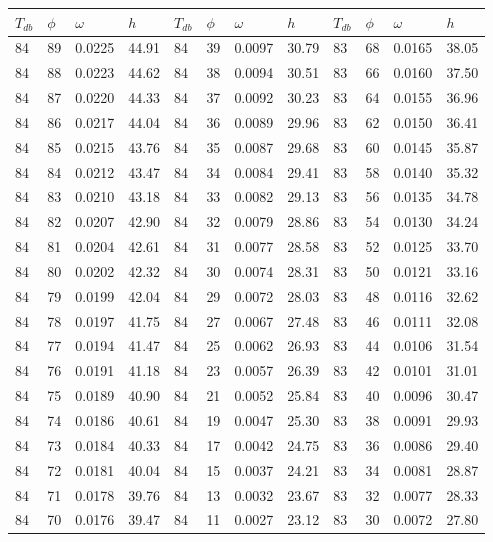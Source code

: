 \begin{tabular}{llll|llll|llll}
 \toprule 
\(T_{db}\) & \(\phi\) & \(\omega\) & \(h\) & \(T_{db}\) & \(\phi\) & \(\omega\) & \(h\) & \(T_{db}\) & \(\phi\) & \(\omega\) & \(h\)  \\ \midrule 
84 & 89 & 0.0225 & 44.91 & 84 & 39 & 0.0097 & 30.79 & 83 & 68 & 0.0165 & 38.05\\
84 & 88 & 0.0223 & 44.62 & 84 & 38 & 0.0094 & 30.51 & 83 & 66 & 0.0160 & 37.50\\
84 & 87 & 0.0220 & 44.33 & 84 & 37 & 0.0092 & 30.23 & 83 & 64 & 0.0155 & 36.96\\
84 & 86 & 0.0217 & 44.04 & 84 & 36 & 0.0089 & 29.96 & 83 & 62 & 0.0150 & 36.41\\
84 & 85 & 0.0215 & 43.76 & 84 & 35 & 0.0087 & 29.68 & 83 & 60 & 0.0145 & 35.87\\
84 & 84 & 0.0212 & 43.47 & 84 & 34 & 0.0084 & 29.41 & 83 & 58 & 0.0140 & 35.32\\
84 & 83 & 0.0210 & 43.18 & 84 & 33 & 0.0082 & 29.13 & 83 & 56 & 0.0135 & 34.78\\
84 & 82 & 0.0207 & 42.90 & 84 & 32 & 0.0079 & 28.86 & 83 & 54 & 0.0130 & 34.24\\
84 & 81 & 0.0204 & 42.61 & 84 & 31 & 0.0077 & 28.58 & 83 & 52 & 0.0125 & 33.70\\
84 & 80 & 0.0202 & 42.32 & 84 & 30 & 0.0074 & 28.31 & 83 & 50 & 0.0121 & 33.16\\
84 & 79 & 0.0199 & 42.04 & 84 & 29 & 0.0072 & 28.03 & 83 & 48 & 0.0116 & 32.62\\
84 & 78 & 0.0197 & 41.75 & 84 & 27 & 0.0067 & 27.48 & 83 & 46 & 0.0111 & 32.08\\
84 & 77 & 0.0194 & 41.47 & 84 & 25 & 0.0062 & 26.93 & 83 & 44 & 0.0106 & 31.54\\
84 & 76 & 0.0191 & 41.18 & 84 & 23 & 0.0057 & 26.39 & 83 & 42 & 0.0101 & 31.01\\
84 & 75 & 0.0189 & 40.90 & 84 & 21 & 0.0052 & 25.84 & 83 & 40 & 0.0096 & 30.47\\
84 & 74 & 0.0186 & 40.61 & 84 & 19 & 0.0047 & 25.30 & 83 & 38 & 0.0091 & 29.93\\
84 & 73 & 0.0184 & 40.33 & 84 & 17 & 0.0042 & 24.75 & 83 & 36 & 0.0086 & 29.40\\
84 & 72 & 0.0181 & 40.04 & 84 & 15 & 0.0037 & 24.21 & 83 & 34 & 0.0081 & 28.87\\
84 & 71 & 0.0178 & 39.76 & 84 & 13 & 0.0032 & 23.67 & 83 & 32 & 0.0077 & 28.33\\
84 & 70 & 0.0176 & 39.47 & 84 & 11 & 0.0027 & 23.12 & 83 & 30 & 0.0072 & 27.80\\

\end{tabular}
